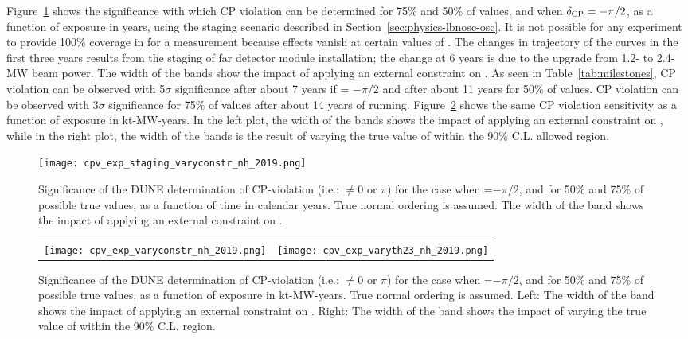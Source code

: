 Figure~\ref{fig:cpv_staging} shows the significance
with which CP violation can be determined for 75\% and 50\% of \deltacp values, and when $\delta_{\rm CP}=-\pi/2$, as a function of exposure in years, using the staging scenario described in Section~\ref{sec:physics-lbnosc-osc}. It is not possible for any experiment to provide 100\% coverage in \deltacp for a  measurement because  effects vanish at certain values of \deltacp. The changes in trajectory of the curves in the first three years results from the staging of far detector module installation; the change at 6 years is due to the upgrade from 1.2- to 2.4-MW beam power. The width of the bands show the impact of applying an external constraint on . As seen in Table~\ref{tab:milestones}, CP violation can be observed with 5$\sigma$ significance after about 7 years if \deltacp = $-\pi/2$ and after about 11 years for 50\% of \deltacp values. CP violation can be observed with 3$\sigma$ significance for 75\% of \deltacp values after about 14 years of running. Figure~\ref{fig:cpv_exposure} shows the same CP violation sensitivity as a function of exposure in kt-MW-years. In the left plot, the width of the bands shows the impact of applying an external constraint on , while in the right plot, the width of the bands is the result of varying the true value of  within the  90\% C.L. allowed region.

\begin{figure}[h!]
    \centering
		\texttt{[image: cpv\_exp\_staging\_varyconstr\_nh\_2019.png]}
	\caption[Significance of the DUNE determination of CP-violation as a function of time]{Significance of the DUNE determination of CP-violation (i.e.: \deltacp $\neq 0$ or $\pi$) for the case when \deltacp=$-\pi/2$, and for 50\% and 75\% of possible true \deltacp values, as a function of time in calendar years. True normal ordering is assumed. The width of the band shows the impact of applying an external constraint on .}
    \label{fig:cpv_staging}
\end{figure}

\begin{figure}[h!]
    \centering
    \begin{tabular}{cc}
		\texttt{[image: cpv\_exp\_varyconstr\_nh\_2019.png]} &
		\texttt{[image: cpv\_exp\_varyth23\_nh\_2019.png]}
    \end{tabular}
	\caption[Significance of the DUNE determination of CP-violation as a function of exposure]{Significance of the DUNE determination of CP-violation (i.e.: \deltacp $\neq 0$ or $\pi$) for the case when \deltacp=$-\pi/2$, and for 50\% and 75\% of possible true \deltacp values, as a function of exposure in kt-MW-years. True normal ordering is assumed. Left: The width of the band shows the impact of applying an external constraint on . Right: The width of the band shows the impact of varying the true value of  within the  90\% C.L. region.}
    \label{fig:cpv_exposure}
\end{figure}

